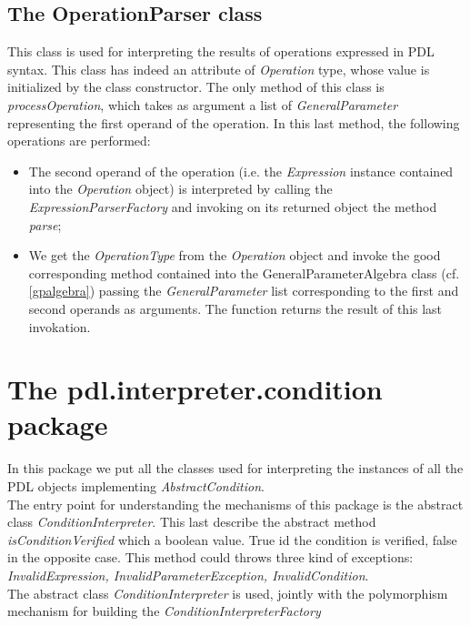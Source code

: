 \documentclass[a4paper,11pt] {ivoa}
\begin{document}
\subsection{The OperationParser class}\label{operationParser}
This class is used for interpreting the results of operations expressed in PDL syntax. 
This class has indeed an attribute of {\it Operation} type, whose value is initialized by the class constructor. The only method of this class is {\it processOperation}, which takes as argument a list of {\it GeneralParameter} representing the first operand of the operation. In this last method, the following operations are performed:
\begin{itemize}
\item The second operand of the operation (i.e. the {\it Expression} instance contained into the {\it Operation} object) is interpreted by calling the {\it ExpressionParserFactory} and invoking on its returned object the method {\it parse};
\item We get the {\it OperationType} from the  {\it Operation} object and invoke the good corresponding method contained into the {GeneralParameterAlgebra} class (cf. \ref{gpalgebra})  passing the {\it GeneralParameter} list corresponding to the first and second operands as arguments. The function returns the result of this last invokation.
\end{itemize}

\section{The pdl.interpreter.condition package}\label{conditionInterpreters}
In this package we put all the classes used for interpreting the instances of all the PDL objects implementing {\it AbstractCondition}.\\
The entry point for understanding the mechanisms of this package is the abstract class {\it ConditionInterpreter}. This last describe the abstract method
{\it isConditionVerified}  which a boolean value. True id the condition is verified, false in the opposite case. This method could throws three kind of exceptions: {\it InvalidExpression,  InvalidParameterException, InvalidCondition}.\\
The abstract class {\it ConditionInterpreter} is used, jointly with the polymorphism mechanism for building the {\it ConditionInterpreterFactory}
\end{document}
